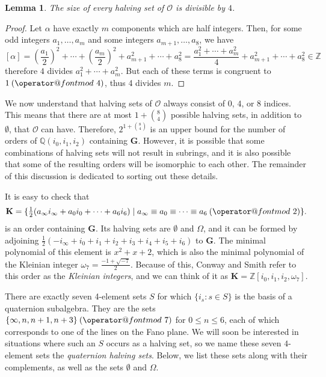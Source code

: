 \documentclass[10pt]{amsart}
\makeatletter
\newcommand{\Q}{\mathbb{Q}}
\newcommand{\Z}{\mathbb{Z}}
\newcommand{\G}{\mathbf{G}}
\newcommand{\K}{\mathbf{K}}
\newcommand{\Ord}{\mathcal{O}}
\newtheorem{lem}[thm]{Lemma}
\DeclareRobustCommand{\pmod}{\@pmods}
\def\@pmods#1{\mkern4mu({\operator@font mod}\mkern 6mu#1)}
\makeatother
\begin{document}
\begin{lem} \label{lem:half4}
\normalfont
The size of every halving set of $\Ord$ is divisible by $4$.
\end{lem}
\begin{proof}
Let $\alpha$ have exactly $m$ components which are half integers.  Then, for some odd integers $a_1, \dots , a_m$ and some integers $a_{m+1}, \dots , a_8$, we have
$$
[\alpha] = \left(\frac{a_1}{2} \right)^2 + \cdots + \left(\frac{a_m}{2}\right)^2 + a_{m+1}^2 + \cdots + a_8^2 = \frac{a_1^2 + \cdots + a_m^2}{4} + a_{m+1}^2 + \cdots + a_8^2 \in \Z
$$
therefore $4$ divides $a_1^2 + \cdots + a_m^2$.  But each of these terms is congruent to $1 \pmod{4}$, thus 4 divides $m$.
\end{proof}

We now understand that halving sets of $\Ord$ always consist of $0$, $4$, or $8$ indices.  This means that there are at most $1 + \binom{8}{4}$ possible halving sets, in addition to $\emptyset$, that $\Ord$ can have.  Therefore, $2^{1+\binom{8}{4}}$ is an upper bound for the number of orders of $\Q(i_0,i_1,i_2)$ containing $\G$.  However, it is possible that some combinations of halving sets will not result in subrings, and it is also possible that some of the resulting orders will be isomorphic to each other.  The remainder of this discussion is dedicated to sorting out these details.

It is easy to check that
$$
\K = \{{\textstyle \frac{1}{2} } (a_\infty i_\infty + a_0 i_0 + \cdots + a_6i_6) \mid a_\infty \equiv a_0 \equiv \cdots \equiv a_6 \pmod{2} \}.
$$
is an order containing $\G$.  Its halving sets are $\emptyset$ and $\Omega$, and it can be formed by adjoining $\frac12(-i_\infty + i_0 + i_1 + i_2 + i_3 + i_4 + i_5 + i_6)$ to $\G$.  The minimal polynomial of this element is $x^2 + x + 2$, which is also the minimal polynomial of the Kleinian integer $\omega_7 = \frac{-1 + \sqrt{-7}}{2}$.  Because of this, Conway and Smith refer to this order as the \emph{Kleinian integers}, and we can think of it as $\K = \Z[i_0,i_1,i_2,\omega_7]$.

There are exactly seven 4-element sets $S$ for which $\{i_s : s \in S\}$ is the basis of a quaternion subalgebra.  They are the sets $\{\infty, n,n+1,n+3\} \pmod{7}$ for $0 \leq n \leq 6$, each of which corresponds to one of the lines on the Fano plane.  We will soon be interested in situations where such an $S$ occurs as a halving set, so we name these seven $4$-element sets the \emph{quaternion halving sets}.  Below, we list these sets along with their complements, as well as the sets $\emptyset$ and $\Omega$.
\end{document}
